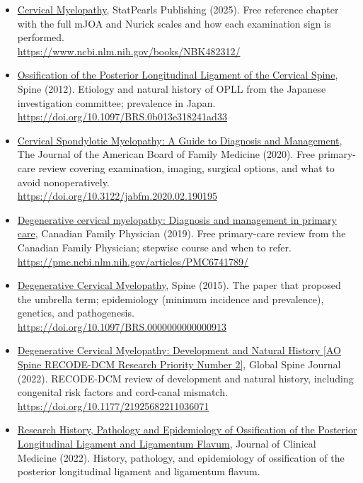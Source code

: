 \documentclass[11pt, letterpaper]{article}
\begin{document}
\begin{itemize}
  \item \href{https://www.ncbi.nlm.nih.gov/books/NBK482312/}{Cervical Myelopathy}, StatPearls Publishing (2025). Free reference chapter with the full mJOA and Nurick scales and how each examination sign is performed.
        \\ {\small\url{https://www.ncbi.nlm.nih.gov/books/NBK482312/}}
  \item \href{https://doi.org/10.1097/BRS.0b013e318241ad33}{Ossification of the Posterior Longitudinal Ligament of the Cervical Spine}, Spine (2012). Etiology and natural history of OPLL from the Japanese investigation committee; prevalence in Japan.
        \\ {\small\url{https://doi.org/10.1097/BRS.0b013e318241ad33}}
  \item \href{https://doi.org/10.3122/jabfm.2020.02.190195}{Cervical Spondylotic Myelopathy: A Guide to Diagnosis and Management}, The Journal of the American Board of Family
                Medicine (2020). Free primary-care review covering examination, imaging, surgical options, and what to avoid nonoperatively.
        \\ {\small\url{https://doi.org/10.3122/jabfm.2020.02.190195}}
  \item \href{https://pmc.ncbi.nlm.nih.gov/articles/PMC6741789/}{Degenerative cervical myelopathy: Diagnosis and management in primary care}, Canadian Family Physician (2019). Free primary-care review from the Canadian Family Physician; stepwise course and when to refer.
        \\ {\small\url{https://pmc.ncbi.nlm.nih.gov/articles/PMC6741789/}}
  \item \href{https://doi.org/10.1097/BRS.0000000000000913}{Degenerative Cervical Myelopathy}, Spine (2015). The paper that proposed the umbrella term; epidemiology (minimum incidence and prevalence), genetics, and pathogenesis.
        \\ {\small\url{https://doi.org/10.1097/BRS.0000000000000913}}
  \item \href{https://doi.org/10.1177/21925682211036071}{Degenerative Cervical Myelopathy: Development and Natural History [AO Spine RECODE-DCM Research Priority Number 2]}, Global Spine Journal (2022). RECODE-DCM review of development and natural history, including congenital risk factors and cord-canal mismatch.
        \\ {\small\url{https://doi.org/10.1177/21925682211036071}}
  \item \href{https://doi.org/10.3390/jcm11185386}{Research History, Pathology and Epidemiology of Ossification of the Posterior Longitudinal Ligament and Ligamentum Flavum}, Journal of Clinical Medicine (2022). History, pathology, and epidemiology of ossification of the posterior longitudinal ligament and ligamentum flavum.

\end{itemize}
\end{document}
